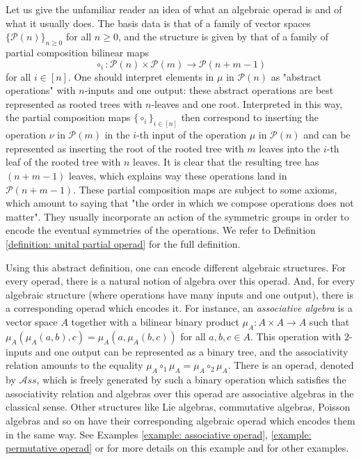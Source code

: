 \documentclass[a4paper,12pt]{amsart}
\begin{document}
\medskip

Let us give the unfamiliar reader an idea of what an algebraic operad is and of what it usually does. The basis data is that of a family of vector spaces $\{\mathcal{P}(n)\}_{n \geq 0}$ for all $n \geq 0$, and the structure is given by that of a family of partial composition bilinear maps 
\[
\circ_i: \mathcal{P}(n) \times \mathcal{P}(m) \longrightarrow \mathcal{P}(n+m-1)
\]
for all $i \in [n]$. One should interpret elements in $\mu$ in $\mathcal{P}(n)$ as "abstract operations" with $n$-inputs and one output: these abstract operations are best represented as rooted trees with $n$-leaves and one root. Interpreted in this way, the partial composition maps $\{\circ_i\}_{i \in [n]}$ then correspond to inserting the operation $\nu$ in $\mathcal{P}(m)$ in the $i$-th input of the operation $\mu$ in $\mathcal{P}(n)$ and can be represented as inserting the root of the rooted tree with $m$ leaves into the $i$-th leaf of the rooted tree with $n$ leaves. It is clear that the resulting tree has $(n+m-1)$ leaves, which explains way these operations land in $\mathcal{P}(n+m-1)$. These partial composition maps are subject to some axioms, which amount to saying that "the order in which we compose operations does not matter". They usually incorporate an action of the symmetric groups in order to encode the eventual symmetries of the operations. We refer to Definition \ref{definition: unital partial operad} for the full definition. 

\medskip

Using this abstract definition, one can encode different algebraic structures. For every operad, there is a natural notion of algebra over this operad. And, for every algebraic structure (where operations have many inputs and one output), there is a corresponding operad which encodes it. For instance, an \textit{associative algebra} is a vector space $A$ together with a bilinear binary product $\mu_A: A \times A \longrightarrow A$ such that $\mu_A(\mu_A(a,b),c) = \mu_A(a, \mu_A(b,c))$ for all $a,b,c \in A$. This operation with $2$-inputs and one output can be represented as a binary tree, and the associativity relation amounts to the equality $\mu_A \circ_1 \mu_A = \mu_A \circ_2 \mu_A$. There is an operad, denoted by $\mathcal{A}ss$, which is freely generated by such a binary operation which satisfies the associativity relation and algebras over this operad are associative algebras in the classical sense. Other structures like Lie algebras, commutative algebras, Poisson algebras and so on have their corresponding algebraic operad which encodes them in the same way. See Examples \ref{example: associative operad}, \ref{example: permutative operad} or \cite[Chapter 13]{LodayVallette} for more details on this example and for other examples.
\end{document}
